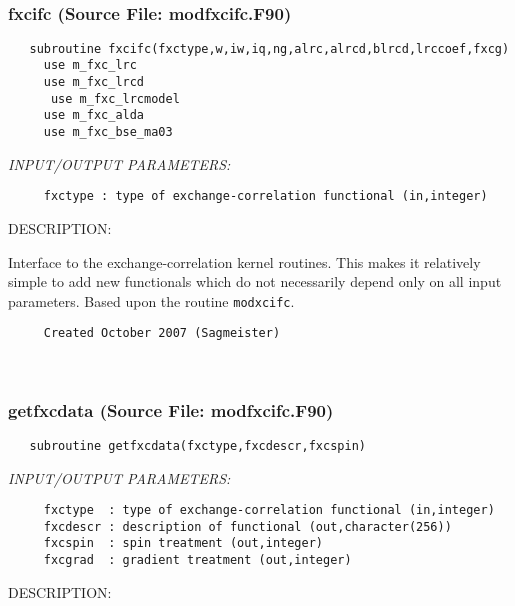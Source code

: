 \documentclass[11pt]{article}
\begin{document}

 
 
\mbox{}\hrulefill\ 
 
\subsubsection{fxcifc (Source File: modfxcifc.F90)}


\begin{verbatim}   subroutine fxcifc(fxctype,w,iw,iq,ng,alrc,alrcd,blrcd,lrccoef,fxcg)
     use m_fxc_lrc
     use m_fxc_lrcd
      use m_fxc_lrcmodel
     use m_fxc_alda
     use m_fxc_bse_ma03\end{verbatim}{\em INPUT/OUTPUT PARAMETERS:}
\begin{verbatim}     fxctype : type of exchange-correlation functional (in,integer)\end{verbatim}
{\sf DESCRIPTION:\\ }


     Interface to the exchange-correlation kernel routines. This makes it 
     relatively
     simple to add new functionals which do not necessarily depend only on
     all input parameters. Based upon the routine {\tt modxcifc}.
  
\begin{verbatim}     Created October 2007 (Sagmeister)\end{verbatim}
 
 
\mbox{}\hrulefill\ 
 
\subsubsection{getfxcdata (Source File: modfxcifc.F90)}


\begin{verbatim}   subroutine getfxcdata(fxctype,fxcdescr,fxcspin)\end{verbatim}{\em INPUT/OUTPUT PARAMETERS:}
\begin{verbatim}     fxctype  : type of exchange-correlation functional (in,integer)
     fxcdescr : description of functional (out,character(256))
     fxcspin  : spin treatment (out,integer)
     fxcgrad  : gradient treatment (out,integer)\end{verbatim}
{\sf DESCRIPTION:\\ }
\end{document}
